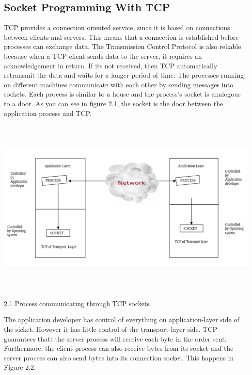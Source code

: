 \documentclass[12pt]{extarticle}
\begin{document}
\subsection{Socket Programming With TCP}

TCP provides a connection oriented service, since it is based on connections between clients
and servers. This means that a connection is established before processes can exchange data. The
Transmission Control Protocol is also reliable because when a TCP client sends data to the server,
it requires an acknowledgement in return. If its not received, then TCP automatically retransmit
the data and waits for a longer period of time. The processes running on different machines communicate
with each other by sending messages into sockets. Each process is similar to a house and the process's 
socket is analogous to a door. As you can see in figure 2.1, the socket is the door between the application
process and TCP.

\begin{center}

    \includegraphics[width=15cm, height=9cm]{Process through TCP sockets}
    
        2.1 Process communicating through TCP sockets
    
\end{center}

The application developer has control of everything on application-layer side of the sicket. However
it has little control of the transport-layer side. TCP guarantees thatt the server process will receive
each byte in the order sent. Furthermore, the client process can also receive bytes from its socket
and the server process can also send bytes into its connection socket. This happens in Figure 2.2.
\end{document}
